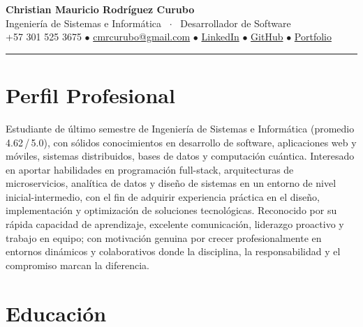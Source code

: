 \documentclass[10pt, letterpaper]{article}
\begin{document}

\begin{center}
    {\Huge\bfseries\color{darkgray} Christian Mauricio Rodr\'iguez Curubo}\\[4pt]
    {\large\color{lightaccent} Ingenier\'ia de Sistemas e Inform\'atica \ $\cdot$ \ Desarrollador de Software}\\[5pt]
    \color{midgray}\small
    +57 301 525 3675 \quad
    $\bullet$ \quad \href{mailto:cmrcurubo@gmail.com}{cmrcurubo@gmail.com} \quad
    $\bullet$ \quad \href{https://www.linkedin.com/in/christian-mauricio-rodriguez-curubo-75501a2a6/}{LinkedIn} \quad
    $\bullet$ \quad \href{https://github.com/ChisCurubo}{GitHub} \quad
    $\bullet$ \quad \href{https://chiscurubo.github.io/portfolio-dev/es/}{Portfolio}
\end{center}
{\color{lightgray}\hrule}
\vspace{2pt}

\section{Perfil Profesional}

\color{darkgray}
Estudiante de \'ultimo semestre de Ingenier\'ia de Sistemas e Inform\'atica (promedio 4.62\,/\,5.0),
con s\'olidos conocimientos en desarrollo de software, aplicaciones web y m\'oviles, sistemas distribuidos,
bases de datos y computaci\'on cu\'antica. Interesado en aportar habilidades en programaci\'on full-stack,
arquitecturas de microservicios, anal\'itica de datos y dise\~no de sistemas en un entorno de nivel
inicial-intermedio, con el fin de adquirir experiencia pr\'actica en el dise\~no, implementaci\'on y
optimizaci\'on de soluciones tecnol\'ogicas. Reconocido por su r\'apida capacidad de aprendizaje,
excelente comunicaci\'on, liderazgo proactivo y trabajo en equipo; con motivaci\'on genuina por crecer
profesionalmente en entornos din\'amicos y colaborativos donde la disciplina, la responsabilidad y
el compromiso marcan la diferencia.
\color{black}

\section{Educaci\'on}
\end{document}
